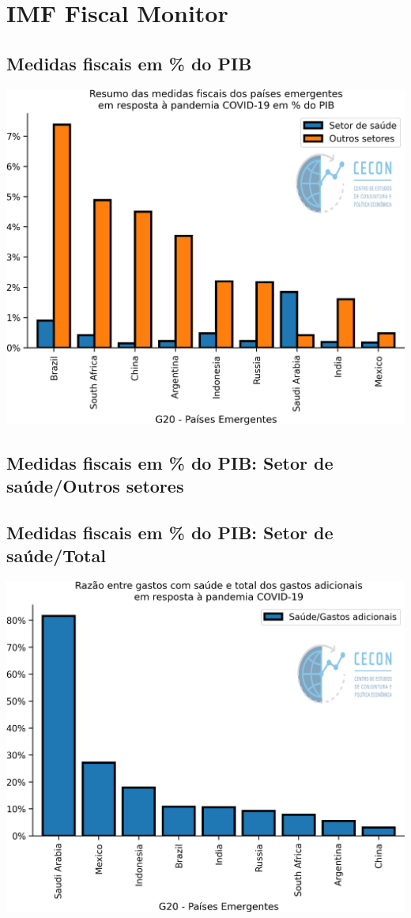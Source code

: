 \documentclass{SelfArx}
\begin{document}
\section*{IMF Fiscal Monitor}
\label{sec:orgb139f2b}
\subsection*{Medidas fiscais em \% do PIB}
\label{sec:orgdcc4f7c}

\begin{center}
\includegraphics[width=.9\linewidth]{./figs/IMF/FiscalMonitor_Covid.png}
\end{center}

\subsection*{Medidas fiscais em \% do PIB: Setor de saúde/Outros setores}
\label{sec:org7166758}

\subsection*{Medidas fiscais em \% do PIB: Setor de saúde/Total}
\label{sec:org5024dd6}

\begin{center}
\includegraphics[width=.9\linewidth]{./figs/IMF/FiscalMonitor_Covid_total.png}
\end{center}
\end{document}
